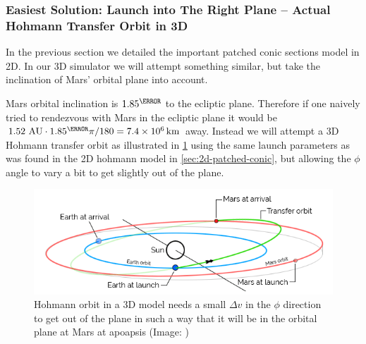\subsubsection{Easiest Solution: Launch into The Right Plane – Actual Hohmann Transfer Orbit in 3D}
In the previous section we detailed the important patched conic sections model in 2D. In our 3D simulator we will attempt something similar, but take the inclination of Mars' orbital plane into account.

Mars orbital inclination is $1.85^\degree$ to the ecliptic plane. Therefore if one naively tried to rendezvous with Mars in the ecliptic plane it would be \( 1.52\ \text{AU} \cdot 1.85^\degree \pi / 180 = \SI{7.4e6}{\km} \) away. Instead we will attempt a 3D Hohmann transfer orbit as illustrated in \cref{fig:hohmann-transfer-orbit-3D} using the same launch parameters as was found in the 2D hohmann model in \cref{sec:2d-patched-conic}, but allowing the \(\phi\) angle to vary a bit to get slightly out of the plane.

\begin{figure}[ht]
    \centering
    \includegraphics[width=0.80\linewidth]{fig/hohmann-transfer-orbit-3D.png}
    \caption{Hohmann orbit in a 3D model needs a small $\Delta v$ in the $\phi$ direction to get out of the plane in such a way that it will be in the orbital plane at Mars at apoapsis (Image: \cite{Daedalis.de})}
    \label{fig:hohmann-transfer-orbit-3D}
\end{figure}
 